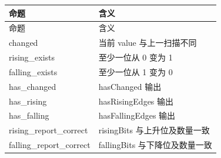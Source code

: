 \begin{longtable}{L{3.3cm}L{10.0cm}}

\toprule

命题 & 含义\\

\midrule

\endfirsthead

\toprule

命题 & 含义\\

\midrule

\endhead

{\ttfamily changed} & 当前 value 与上一扫描不同\\

{\ttfamily rising\_exists} & 至少一位从 0 变为 1\\

{\ttfamily falling\_exists} & 至少一位从 1 变为 0\\

{\ttfamily has\_changed} & hasChanged 输出\\

{\ttfamily has\_rising} & hasRisingEdges 输出\\

{\ttfamily has\_falling} & hasFallingEdges 输出\\

{\ttfamily rising\_report\_correct} & risingBits 与上升位及数量一致\\

{\ttfamily falling\_report\_correct} & fallingBits 与下降位及数量一致\\

\bottomrule

\end{longtable}

